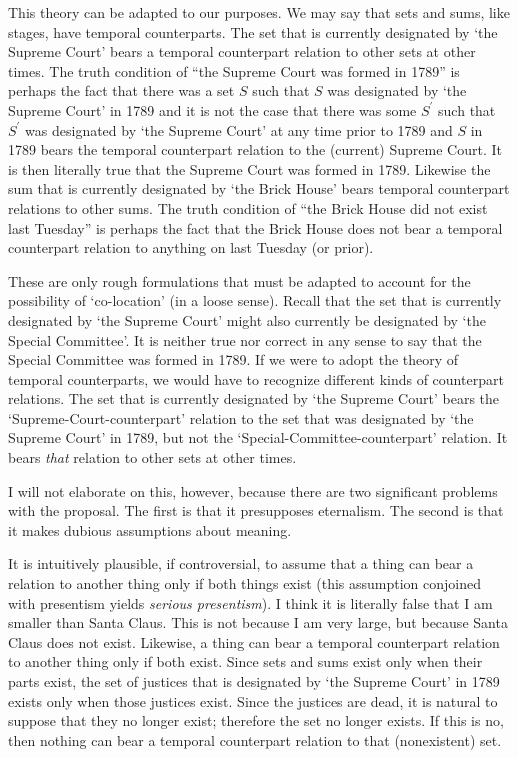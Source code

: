 \documentclass[11pt]{article}
\begin{document}
\begin{spacing}{1.5}
This theory can be adapted to our purposes.  We may say that sets and
sums, like stages, have temporal counterparts.  The set that is
currently designated by `the Supreme Court' bears a temporal
counterpart relation to other sets at other times.  The truth
condition of ``the Supreme Court was formed in 1789'' is perhaps the
fact that there was a set $S$ such that $S$ was designated by `the
Supreme Court' in 1789 and it is not the case that there was some
$S^{\prime}$ such that $S^{\prime}$ was designated by `the Supreme
Court' at any time prior to 1789 and $S$ in 1789 bears the temporal
counterpart relation to the (current) Supreme Court.  It is then
literally true that the Supreme Court was formed in 1789.  Likewise
the sum that is currently designated by `the Brick House' bears
temporal counterpart relations to other sums.  The truth condition of
``the Brick House did not exist last Tuesday'' is perhaps the fact
that the Brick House does not bear a temporal counterpart relation to
anything on last Tuesday (or prior).

These are only rough formulations that must be adapted to account for
the possibility of `co-location' (in a loose sense).  Recall that the
set that is currently designated by `the Supreme Court' might also
currently be designated by `the Special Committee'.  It is neither
true nor correct in any sense to say that the Special Committee was
formed in 1789.  If we were to adopt the theory of temporal
counterparts, we would have to recognize different kinds of
counterpart relations.  The set that is currently designated by `the
Supreme Court' bears the `Supreme-Court-counterpart' relation to the
set that was designated by `the Supreme Court' in 1789, but not the
`Special-Committee-counterpart' relation.  It bears {\em that}
relation to other sets at other times.

I will not elaborate on this, however, because there are two
significant problems with the proposal.  The first is that it
presupposes eternalism.  The second is that it makes dubious
assumptions about meaning.

It is intuitively plausible, if controversial, to assume that a thing
can bear a relation to another thing only if both things exist (this
assumption conjoined with presentism yields {\em serious presentism}).
I think it is literally false that I am smaller than Santa Claus.
This is not because I am very large, but because Santa Claus does not
exist.  Likewise, a thing can bear a temporal counterpart relation to
another thing only if both exist.  Since sets and sums exist only when
their parts exist, the set of justices that is designated by `the
Supreme Court' in 1789 exists only when those justices exist.  Since
the justices are dead, it is natural to suppose that they no longer
exist; therefore the set no longer exists.  If this is no, then
nothing can bear a temporal counterpart relation to that (nonexistent)
set.


\end{spacing}
\end{document}

